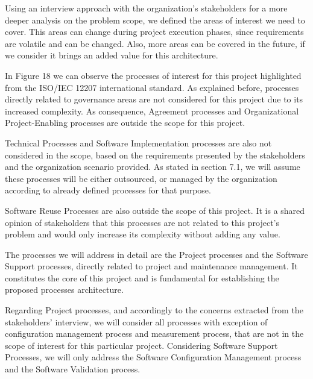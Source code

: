 Using an interview approach with the organization's stakeholders for a more deeper analysis on the problem scope, we defined the areas of interest we need to cover. This areas can change during project execution phases, since requirements are volatile and can be changed. Also, more areas can be covered in the future, if we consider it brings an added value for this architecture.\par
In Figure 18 we can observe the processes of interest for this project highlighted from the ISO/IEC 12207 international standard. As explained before, processes directly related to governance areas are not considered for this project due to its increased complexity. As consequence, Agreement processes and Organizational Project-Enabling processes are outside the scope for this project.\par
Technical Processes and Software Implementation processes are also not considered in the scope, based on the requirements presented by the stakeholders and the organization scenario provided. As stated in section 7.1, we will assume these processes will be either outsourced, or managed by the organization according to already defined processes for that purpose.\par
Software Reuse Processes are also outside the scope of this project. It is a shared opinion of stakeholders that this processes are not related to this project's problem and would only increase its complexity without adding any value.\par
The processes we will address in detail are the Project processes and the Software Support processes, directly related to project and maintenance management. It constitutes the core of this project and is fundamental for establishing the proposed processes architecture.\par
Regarding Project processes, and accordingly to the concerns extracted from the stakeholders' interview, we will consider all processes with exception of configuration management process and measurement process, that are not in the scope of interest for this particular project. Considering Software Support Processes, we will only address the Software Configuration Management process and the Software Validation process.\par



